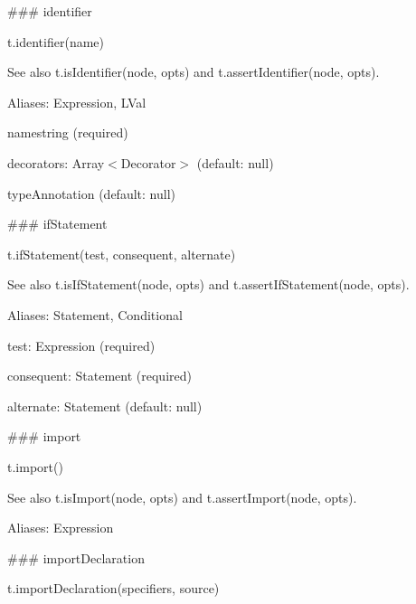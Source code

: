 \#\#\# identifier 
\begin{DoxyCode}
t.identifier(name)
\end{DoxyCode}


See also {\ttfamily t.\+is\+Identifier(node, opts)} and {\ttfamily t.\+assert\+Identifier(node, opts)}.

Aliases\+: {\ttfamily Expression}, {\ttfamily L\+Val}


\begin{DoxyItemize}
\item {\ttfamily name}{\ttfamily string} (required)
\item {\ttfamily decorators}\+: {\ttfamily Array$<$Decorator$>$} (default\+: {\ttfamily null})
\item {\ttfamily type\+Annotation} (default\+: {\ttfamily null}) 


\end{DoxyItemize}

\#\#\# if\+Statement 
\begin{DoxyCode}
t.ifStatement(test, consequent, alternate)
\end{DoxyCode}


See also {\ttfamily t.\+is\+If\+Statement(node, opts)} and {\ttfamily t.\+assert\+If\+Statement(node, opts)}.

Aliases\+: {\ttfamily Statement}, {\ttfamily Conditional}


\begin{DoxyItemize}
\item {\ttfamily test}\+: {\ttfamily Expression} (required)
\item {\ttfamily consequent}\+: {\ttfamily Statement} (required)
\item {\ttfamily alternate}\+: {\ttfamily Statement} (default\+: {\ttfamily null}) 


\end{DoxyItemize}

\#\#\# import 
\begin{DoxyCode}
t.import()
\end{DoxyCode}


See also {\ttfamily t.\+is\+Import(node, opts)} and {\ttfamily t.\+assert\+Import(node, opts)}.

Aliases\+: {\ttfamily Expression}





\#\#\# import\+Declaration 
\begin{DoxyCode}
t.importDeclaration(specifiers, source)
\end{DoxyCode}


